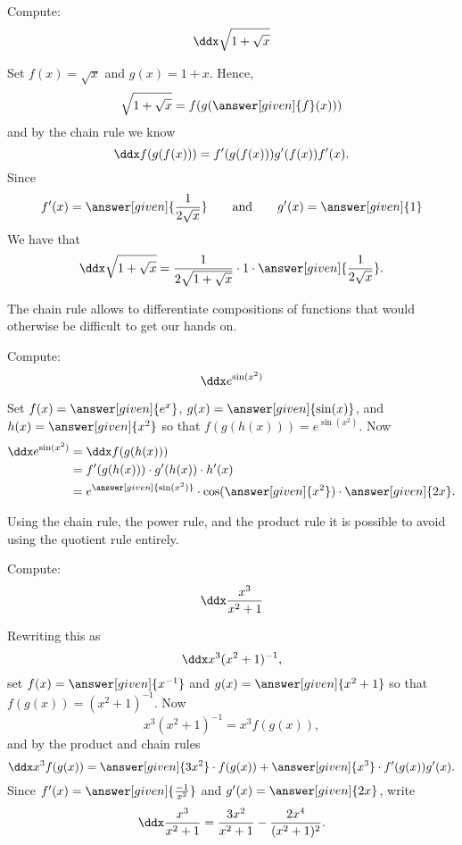 \documentclass{ximera}
\begin{document}
\begin{example}
	Compute:
	\[ \ddx \sqrt{1+\sqrt{x}} \]
	
	\begin{explanation}
		Set $f(x)=\sqrt{x}$ and $g(x)=1+x$. Hence,
		\[\sqrt{1+\sqrt{x}}=f(g(\answer[given]{f}(x))) \]
		and by the chain rule we know
		\[ \ddx f(g(f(x))) = f'(g(f(x)))g'(f(x))f'(x).\]
		Since 
		\[ f'(x) = \answer[given]{\frac{1}{2\sqrt{x}}} \qquad\text{and}\qquad g'(x) = \answer[given]{1} \]
		We have that
		\[ \ddx \sqrt{1+\sqrt{x}} = \frac{1}{2\sqrt{1+\sqrt{x}}}\cdot 1\cdot  \answer[given]{\frac{1}{2\sqrt{x}}}. \]
	\end{explanation}
\end{example}

The chain rule allows to differentiate compositions of functions that
would otherwise be difficult to get our hands on.

\begin{example}
	Compute:
	\[ \ddx e^{\sin(x^2)} \]
	
	\begin{explanation}
		Set $f(x) = \answer[given]{e^x}$, $g(x) = \answer[given]{\sin(x)}$, and $h(x) = \answer[given]{x^2}$
		so that $f(g(h(x))) = e^{\sin(x^2)}$. Now
		\begin{align*}
			\ddx e^{\sin(x^2)} &= \ddx f(g(h(x)))\\
		 		&= f'(g(h(x))) \cdot g'(h(x)) \cdot h'(x)\\
				&= e^{\answer[given]{\sin(x^2)}} \cdot \cos(\answer[given]{x^2}) \cdot \answer[given]{2x}.
		\end{align*}
	\end{explanation}
\end{example}




Using the chain rule, the power rule, and the product rule it is
possible to avoid using the quotient rule entirely.

\begin{example}
	Compute:
	\[ \ddx \frac{x^3}{x^2+1} \]
	
	\begin{explanation}
		Rewriting this as 
		\[ \ddx x^3(x^2+1)^{-1},  \]
		set $f(x) = \answer[given]{x^{-1}}$ and $g(x) = \answer[given]{x^2+1}$ so that $f(g(x)) = (x^2 + 1)^{-1}$. Now
		\[ x^3(x^2+1)^{-1} = x^3 f(g(x)), \]
		and by the product and chain rules
		\[ \ddx x^3 f(g(x)) = \answer[given]{3x^2} \cdot f(g(x))+ \answer[given]{x^3} \cdot f'(g(x))g'(x). \]
		Since $f'(x) = \answer[given]{\frac{-1}{x^2}}$ and $g'(x) = \answer[given]{2x}$, write
		\[ \ddx \frac{x^3}{x^2+1} = \frac{3x^2}{x^2+1}-\frac{2x^4}{(x^2+1)^2}. \]
	\end{explanation}
\end{example}
\end{document}
